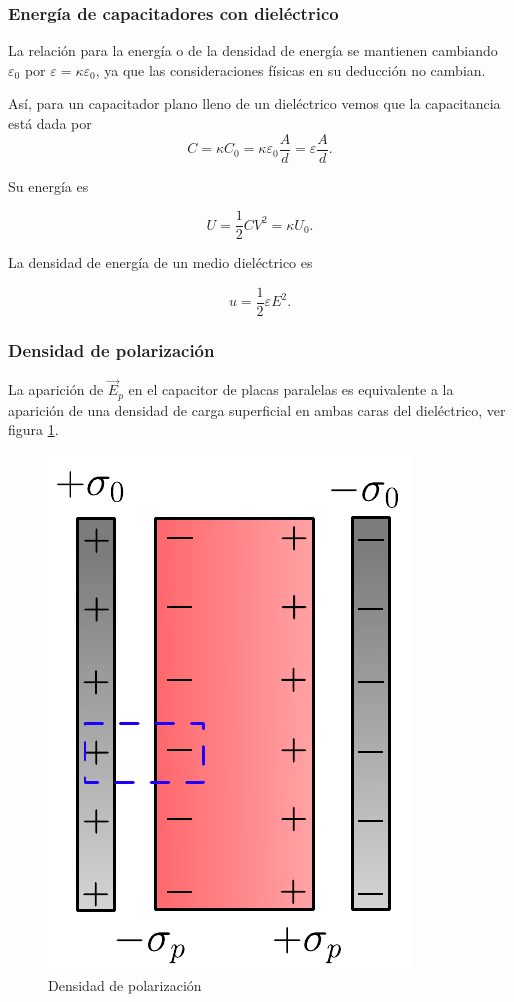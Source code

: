 \subsubsection{Energía de capacitadores con dieléctrico}

La relación para la energía o de la densidad de energía se mantienen cambiando $\varepsilon_0$ por $\varepsilon = \kappa \varepsilon_0$, ya que las consideraciones físicas en su deducción no cambian.

Así, para un capacitador plano lleno de un dieléctrico vemos que la capacitancia está dada por
$$C = \kappa C_0 = \kappa \varepsilon_0 \frac{A}{d} = \varepsilon \frac{A}{d}.$$

Su energía es
\begin{shaded}
    $$U = \frac{1}{2} C V^2 = \kappa U_0.$$
\end{shaded}

La densidad de energía de un medio dieléctrico es
\begin{shaded}
    $$u = \frac{1}{2} \varepsilon E^2.$$
\end{shaded}

\subsubsection{Densidad de polarización}

La aparición de $\Vec{E}_{p}$ en el capacitor de placas paralelas es equivalente a la aparición de una densidad de carga superficial en ambas caras del dieléctrico, ver figura \ref{fig:densidad-polarizacion}.

\begin{figure}[H]
    \centering
    \includegraphics[scale = 0.7]{Figuras/Densidad-Polarizacion.pdf}
    \caption{Densidad de polarización}
    \label{fig:densidad-polarizacion}
\end{figure}

